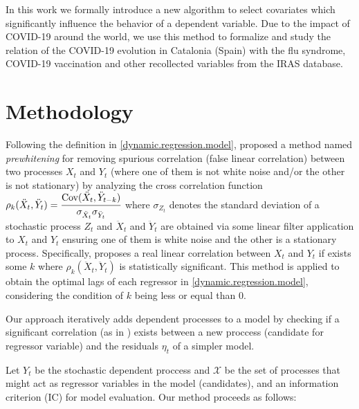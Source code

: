 \documentclass[a4paper]{easychair}
\begin{document}
In this work we formally introduce a new algorithm to select covariates which significantly influence the behavior of a dependent variable. Due to the impact of COVID-19 around the world, we use this method to formalize and study the relation of the COVID-19 evolution in Catalonia (Spain) with the flu syndrome, COVID-19 vaccination and other recollected variables from the IRAS database.

\section{Methodology}

Following the definition in \ref{dynamic.regression.model}, \cite{cryer2008time} proposed a method named \textit{prewhitening} for removing spurious correlation (false linear correlation) between two processes $X_t$ and $Y_t$ (where one of them is not white noise and/or the other is not stationary) by analyzing the cross correlation function $\rho_k(\ddot{X}_t, \ddot{Y}_t) =  \cfrac{\text{Cov}(\ddot{X}_t, \ddot{Y}_{t-k})}{\sigma_{\ddot{X}_t} \sigma_{\ddot{Y}_t}} $ where $\sigma_{Z_t}$ denotes the standard deviation of a stochastic process $Z_t$ and $\ddot{X}_t$ and $\ddot{Y}_t$ are obtained via some linear filter application to $X_t$ and $Y_t$ ensuring one of them is white noise and the other is a stationary process. Specifically, \cite{cryer2008time} proposes a real linear correlation between $X_t$ and $Y_t$ if exists some $k$ where $\rho_k(\ddot{X}_t, \ddot{Y}_t)$ is statistically significant. This method is applied to obtain the optimal lags of each regressor in \ref{dynamic.regression.model}, considering the condition of $k$ being less or equal than $0$.

Our approach iteratively adds dependent processes to a model by checking if a significant correlation (as in \cite{cryer2008time}) exists between a new proccess (candidate for regressor variable) and the residuals $\eta_t$ of a simpler model.

Let $Y_t$ be the stochastic dependent proccess and $\mathcal{X}$ be the set of processes that might act as regressor variables in the model (candidates), and an information criterion (IC) for model evaluation. Our method proceeds as follows:
\end{document}

